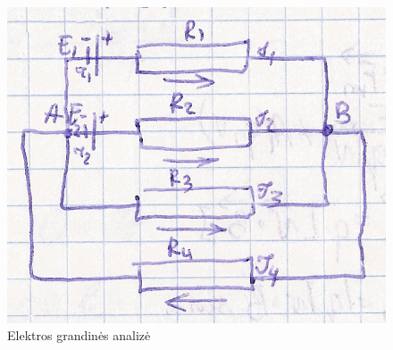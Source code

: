 \begin{figure}[H]
  \begin{center}
    \includegraphics[height=0.5\textwidth]{images/grandine2.png}
  \end{center}
  \caption{Elektros grandinės analizė}
  \label{fig:grandine2}
\end{figure}

